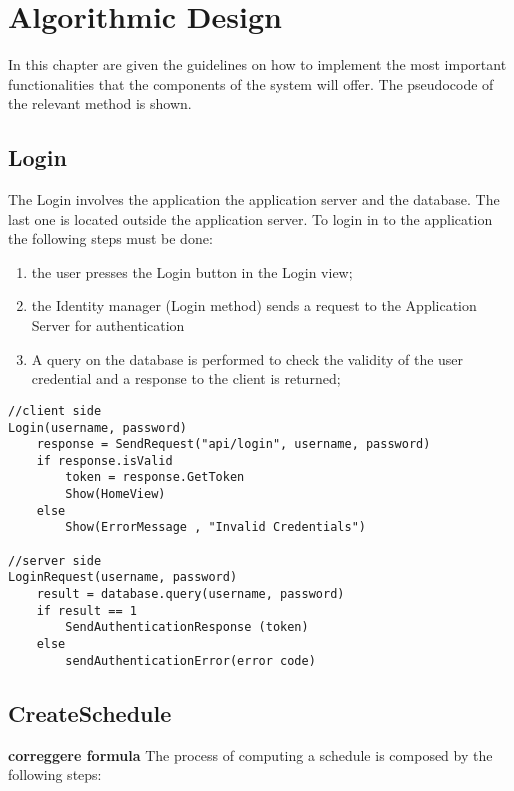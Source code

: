 \chapter{Algorithmic Design}
In this chapter are given the guidelines on how to implement the most important functionalities that the components of the system will offer. The pseudocode of the relevant method is shown. 

\section{Login}
The Login involves the application the application server and the database. The last one is located outside the application server. 
To login in to the application the following steps must be done:
\begin{enumerate}
\item the user presses the Login button in the Login view;
\item the Identity manager (Login method) sends a request to the Application Server for authentication
\item A query on the database is performed to check the validity of the user credential and a response to the client is returned;
\end{enumerate}

\begin{lstlisting}
//client side
Login(username, password)
	response = SendRequest("api/login", username, password)
	if response.isValid 
		token = response.GetToken
		Show(HomeView)
	else
		Show(ErrorMessage , "Invalid Credentials")

//server side
LoginRequest(username, password)
	result = database.query(username, password)
	if result == 1
		SendAuthenticationResponse (token)
	else
		sendAuthenticationError(error code)
\end{lstlisting}

\section{CreateSchedule}
\textbf{correggere formula}
The process of computing a schedule is composed by the following steps:

